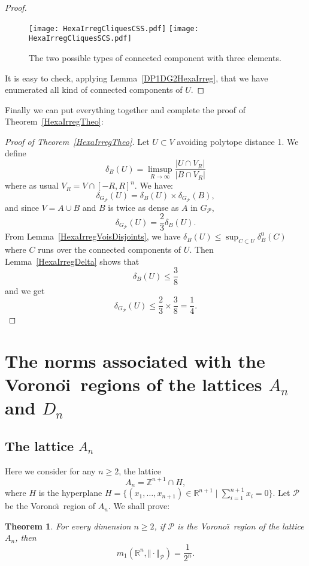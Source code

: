 \documentclass{amsart}                     %
\newtheorem{theo}{Theorem}
\newcommand{\Z}{{\mathbb Z}}
\newcommand{\R}{{\mathbb R}}
\newcommand{\tref}[1]{Theorem~\textup{\ref{#1}}}
\newcommand{\lref}[1]{Lemma~\textup{\ref{#1}}}
\begin{document}
\begin{proof}
\begin{figure}[!ht]
\texttt{[image: HexaIrregCliquesCSS.pdf]} \hspace{10pt}
\texttt{[image: HexaIrregCliquesSCS.pdf]} 
\caption{The two possible types of connected component with three elements.\label{HexaIrregCC3}}
\end{figure}

It is easy to check, applying \lref{DP1DG2HexaIrreg}, that we have enumerated all kind of connected components
of $U$. 
\end{proof}

Finally we can put everything together and complete the proof of \tref{HexaIrregTheo}:

\begin{proof}[Proof of \tref{HexaIrregTheo}] 
Let $U\subset V$ avoiding polytope distance 1.
We define
$$ \delta_B(U)=\limsup_{R\to\infty} \frac{|U\cap V_R|}{|B\cap V_R|} $$
where as usual $V_R=V\cap [-R,R]^n$. We have:
$$ \delta_{G_{\mathcal P}}(U)=\delta_B(U) \times \delta_{G_{\mathcal P}} (B), $$
and since $V=A\cup B$ and $B$ is twice as dense as $A$ in $G_{\mathcal P}$, 
$$ \delta_{G_{\mathcal P}}(U)=\frac{2}{3}\delta_B(U). $$
From \lref{HexaIrregVoisDisjoints}, we have $\delta_B(U)\leq \sup_{C\subset U} \delta_B^0(C)$ where $C$ runs over the connected components of $U$. Then \lref{HexaIrregDelta} shows that
$$ \delta_B(U)\leq \frac{3}{8} $$ 
and  we get
$$ \delta_{G_{\mathcal P}}(U) \leq \frac{2}{3} \times \frac{3}{8} =\frac{1}{4}. $$
\end{proof}

\section{The norms associated with the Vorono\"\i\  regions of the lattices $A_n$ and $D_n$}\label{SectionFamilles}



\subsection{The lattice $A_n$} \label{SoussecAn}

Here we consider for any $n\geq 2$, the lattice $$A_n=\Z^{n+1}\cap H,$$ where $H$ is the hyperplane $H=\{(x_1,\ldots,x_{n+1})\in \R^{n+1}\mid \sum_{i=1}^{n+1} x_i=0\}$. Let $\mathcal{P}$ be the Vorono\"\i\  region of $A_n$. We shall prove:

\begin{theo}\label{AnTheo}
For every dimension $n\geq 2$, if $\mathcal{P}$ is the Vorono\"\i\  region of the lattice $A_n$, then
$$m_1(\R^n,\Vert   \cdot\Vert  _\mathcal{P})=\frac{1}{2^n}.$$
\end{theo}
\end{document}
